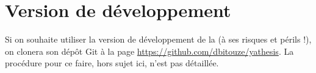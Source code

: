 \lstset{frame=none}

\section{Version de développement}
\label{sec:vers-de-devel}

Si on souhaite utiliser la version de développement de la \yatcl{} (à ses
risques et périls !), on clonera son dépôt Git à la page
\url{https://github.com/dbitouze/yathesis}. La procédure pour ce faire, hors
sujet ici, n'est pas détaillée.

%
\iffalse
\fi
